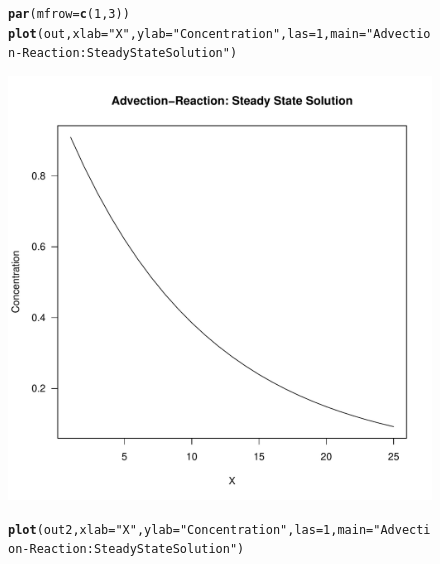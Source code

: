 \documentclass{tufte-handout}\usepackage[]{graphicx}\usepackage[]{xcolor}
\makeatletter
\def\maxwidth{ %
  \ifdim\Gin@nat@width>\linewidth
    \linewidth
  \else
    \Gin@nat@width
  \fi
}
\newcommand{\hlnum}[1]{\textcolor[rgb]{0.686,0.059,0.569}{#1}}%
\newcommand{\hlstr}[1]{\textcolor[rgb]{0.192,0.494,0.8}{#1}}%
\newcommand{\hlstd}[1]{\textcolor[rgb]{0.345,0.345,0.345}{#1}}%
\newcommand{\hlkwc}[1]{\textcolor[rgb]{0.333,0.667,0.333}{#1}}%
\newcommand{\hlkwd}[1]{\textcolor[rgb]{0.737,0.353,0.396}{\textbf{#1}}}%
\newenvironment{kframe}{%
 \def\at@end@of@kframe{}%
 \ifinner\ifhmode%
  \def\at@end@of@kframe{\end{minipage}}%
  \begin{minipage}{\columnwidth}%
 \fi\fi%
 \def\FrameCommand##1{\hskip\@totalleftmargin \hskip-\fboxsep
 \colorbox{shadecolor}{##1}\hskip-\fboxsep
     \hskip-\linewidth \hskip-\@totalleftmargin \hskip\columnwidth}%
 \MakeFramed {\advance\hsize-\width
   \@totalleftmargin\z@ \linewidth\hsize
   \@setminipage}}%
 {\par\unskip\endMakeFramed%
 \at@end@of@kframe}
\newenvironment{knitrout}{}{} %
\makeatother
\begin{document}
\begin{figure}
\begin{knitrout}
\color{fgcolor}\begin{kframe}
\begin{alltt}
\hlkwd{par}\hlstd{(}\hlkwc{mfrow}\hlstd{=}\hlkwd{c}\hlstd{(}\hlnum{1}\hlstd{,}\hlnum{3}\hlstd{))}
\hlkwd{plot}\hlstd{(out,} \hlkwc{xlab} \hlstd{=} \hlstr{"X"}\hlstd{,} \hlkwc{ylab} \hlstd{=} \hlstr{"Concentration"}\hlstd{,} \hlkwc{las}\hlstd{=}\hlnum{1}\hlstd{,} \hlkwc{main}\hlstd{=}\hlstr{"Advection-Reaction: Steady State Solution"}\hlstd{)}
\end{alltt}
\end{kframe}
\includegraphics[width=\maxwidth]{figure/unnamed-chunk-7-1} 
\begin{kframe}\begin{alltt}
\hlkwd{plot}\hlstd{(out2,} \hlkwc{xlab} \hlstd{=} \hlstr{"X"}\hlstd{,} \hlkwc{ylab} \hlstd{=} \hlstr{"Concentration"}\hlstd{,} \hlkwc{las}\hlstd{=}\hlnum{1}\hlstd{,} \hlkwc{main}\hlstd{=}\hlstr{"Advection-Reaction: Steady State Solution"}\hlstd{)}
\end{alltt}
\end{kframe}

\end{knitrout}
\end{figure}
\end{document}
